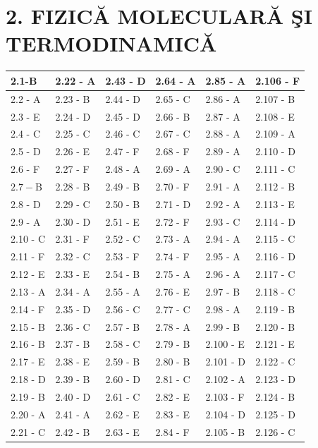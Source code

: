 \documentclass[10pt]{article}
\begin{document}
\section*{2. FIZICĂ MOLECULARĂ ŞI TERMODINAMICĂ}
\begin{center}
\begin{tabular}{|l|l|l|l|l|l|}
\hline
2.1-B & 2.22 - A & 2.43 - D & 2.64 - A & 2.85 - A & 2.106 - F \\
\hline
2.2 - A & 2.23 - B & 2.44 - D & 2.65 - C & 2.86 - A & 2.107 - B \\
\hline
2.3 - E & 2.24 - D & 2.45 - D & 2.66 - B & 2.87 - A & 2.108 - E \\
\hline
2.4 - C & 2.25 - C & 2.46 - C & 2.67 - C & 2.88 - A & 2.109 - A \\
\hline
2.5 - D & 2.26 - E & 2.47 - F & 2.68 - F & 2.89 - A & 2.110 - D \\
\hline
2.6 - F & 2.27 - F & 2.48 - A & 2.69 - A & 2.90 - C & 2.111 - C \\
\hline
$2.7-\mathrm{B}$ & 2.28 - B & 2.49 - B & 2.70 - F & 2.91 - A & 2.112 - B \\
\hline
2.8 - D & 2.29 - C & 2.50 - B & 2.71 - D & 2.92 - A & 2.113 - E \\
\hline
2.9 - A & 2.30 - D & 2.51 - E & 2.72 - F & 2.93 - C & 2.114 - D \\
\hline
2.10 - C & 2.31 - F & 2.52 - C & 2.73 - A & 2.94 - A & 2.115 - C \\
\hline
2.11 - F & 2.32 - C & 2.53 - F & 2.74 - F & 2.95 - A & 2.116 - D \\
\hline
2.12 - E & 2.33 - E & 2.54 - B & 2.75 - A & 2.96 - A & 2.117 - C \\
\hline
2.13 - A & 2.34 - A & 2.55 - A & 2.76 - E & 2.97 - B & 2.118 - C \\
\hline
2.14 - F & 2.35 - D & 2.56 - C & 2.77 - C & 2.98 - A & 2.119 - B \\
\hline
2.15 - B & 2.36 - C & 2.57 - B & 2.78 - A & 2.99 - B & 2.120 - B \\
\hline
2.16 - B & 2.37 - B & 2.58 - C & 2.79 - B & 2.100 - E & 2.121 - E \\
\hline
2.17 - E & 2.38 - E & 2.59 - B & 2.80 - B & 2.101 - D & 2.122 - C \\
\hline
2.18 - D & 2.39 - B & 2.60 - D & 2.81 - C & 2.102 - A & 2.123 - D \\
\hline
2.19 - B & 2.40 - D & 2.61 - C & 2.82 - E & 2.103 - F & 2.124 - B \\
\hline
2.20 - A & 2.41 - A & 2.62 - E & 2.83 - E & 2.104 - D & 2.125 - D \\
\hline
2.21 - C & 2.42 - B & 2.63 - E & 2.84 - F & 2.105 - B & 2.126 - C \\
\hline
\end{tabular}
\end{center}
\end{document}
